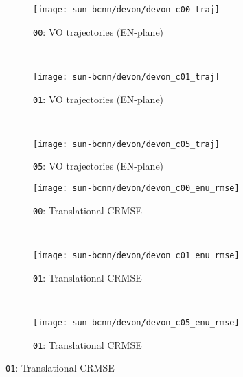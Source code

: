 \begin{figure}
	\centering
	\begin{subfigure}{0.3\textwidth}
    	\texttt{[image: sun-bcnn/devon/devon\_c00\_traj]}
        \caption{\texttt{00}: VO trajectories (EN-plane)}
        \label{fig:devon_c00_traj}
    \end{subfigure}
    ~
   	\begin{subfigure}{0.3\textwidth}
    	\texttt{[image: sun-bcnn/devon/devon\_c01\_traj]}
        \caption{\texttt{01}: VO trajectories (EN-plane)}
        \label{fig:devon_c01_traj}
    \end{subfigure}
    ~
    \begin{subfigure}{0.3\textwidth}
    	\texttt{[image: sun-bcnn/devon/devon\_c05\_traj]}
        \caption{\texttt{05}: VO trajectories (EN-plane)}
        \label{fig:devon_c05_traj}
    \end{subfigure}
    
    \begin{subfigure}{0.3\textwidth}
    	\texttt{[image: sun-bcnn/devon/devon\_c00\_enu\_rmse]}
        \caption{\texttt{00}: Translational CRMSE}
        \label{fig:devon_c00_transerr_enu}
    \end{subfigure}
    ~
    \begin{subfigure}{0.3\textwidth}
    	\texttt{[image: sun-bcnn/devon/devon\_c01\_enu\_rmse]}
        \caption{\texttt{01}: Translational CRMSE}
        \label{fig:devon_c01_transerr_enu}
    \end{subfigure}
    ~
    \begin{subfigure}{0.3\textwidth}
    	\texttt{[image: sun-bcnn/devon/devon\_c05\_enu\_rmse]}
        \caption{\texttt{01}: Translational CRMSE}
        \label{fig:devon_c05_transerr_enu}
    \end{subfigure}
    

\end{figure}
